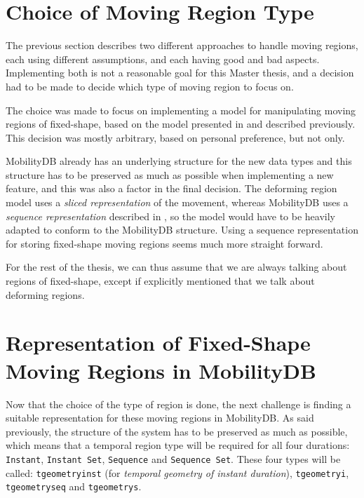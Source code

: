 
\section{Choice of Moving Region Type}
\label{section:region_type_choice}

The previous section describes two different approaches to handle moving regions, each using different assumptions, and each having good and bad aspects. Implementing both is not a reasonable goal for this Master thesis, and a decision had to be made to decide which type of moving region to focus on.

The choice was made to focus on implementing a model for manipulating moving regions of fixed-shape, based on the model presented in \cite{fmregion} and described previously. This decision was mostly arbitrary, based on personal preference, but not only. 

MobilityDB already has an underlying structure for the new data types and this structure has to be preserved as much as possible when implementing a new feature, and this was also a factor in the final decision. The deforming region model uses a \textit{sliced representation} of the movement, whereas MobilityDB uses a \textit{sequence representation} described in \cite{mobilitydb}, so the model would have to be heavily adapted to conform to the MobilityDB structure. Using a sequence representation for storing fixed-shape moving regions seems much more straight forward.

For the rest of the thesis, we can thus assume that we are always talking about regions of fixed-shape, except if explicitly mentioned that we talk about deforming regions.

\section{Representation of Fixed-Shape Moving Regions in MobilityDB}
\label{section:internal_repr}

Now that the choice of the type of region is done, the next challenge is finding a suitable representation for these moving regions in MobilityDB. As said previously, the structure of the system has to be preserved as much as possible, which means that a temporal region type will be required for all four durations: \lstinline{Instant}, \lstinline{Instant Set}, \lstinline{Sequence} and \lstinline{Sequence Set}. These four types will be called: \lstinline{tgeometryinst} (for \textit{temporal geometry of instant duration}), \lstinline{tgeometryi}, \lstinline{tgeometryseq} and \lstinline{tgeometrys}.

